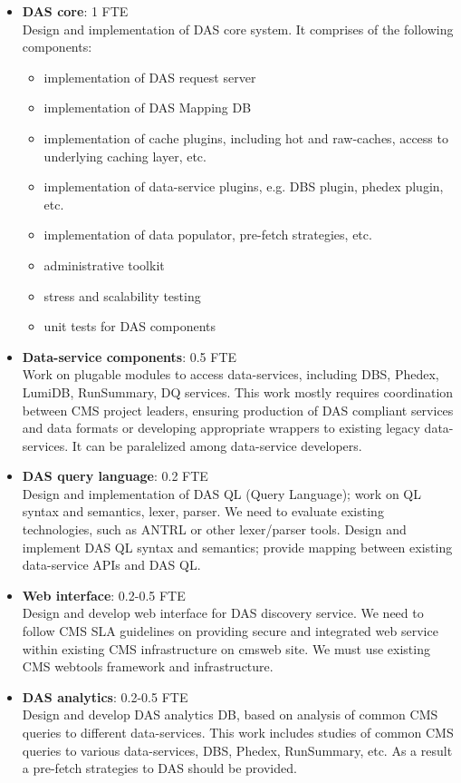 \documentclass[a4paper]{jpconf}
\begin{document}
\begin{itemize}
\item
{\bf DAS core}: 1 FTE\\
Design and implementation of DAS core system. It comprises of the following
components:
\begin{itemize}
\item implementation of DAS request server
\item implementation of DAS Mapping DB
\item implementation of cache plugins, including hot and raw-caches, access
to underlying caching layer, etc.
\item implementation of data-service plugins, e.g. DBS plugin, phedex plugin, etc.
\item implementation of data populator, pre-fetch strategies, etc.
\item administrative toolkit
\item stress and scalability testing
\item unit tests for DAS components
\end{itemize}

\item
{\bf Data-service components}: 0.5 FTE\\
Work on plugable modules to access data-services,
including DBS, Phedex, LumiDB, RunSummary, DQ services.
This work mostly requires coordination between CMS project
leaders, ensuring production of DAS compliant services and data formats or
developing appropriate wrappers to existing legacy data-services. 
It can be paralelized among data-service developers.

\item
{\bf DAS query language}: 0.2 FTE \\
Design and implementation of DAS QL (Query Language);
work on QL syntax and semantics, lexer, parser.
We need to evaluate existing technologies, such as ANTRL or
other lexer/parser tools. Design and implement DAS QL syntax and
semantics; provide mapping between existing data-service APIs and
DAS QL.

\item
{\bf Web interface}: 0.2-0.5 FTE \\
Design and develop web interface for DAS discovery service.
We need to follow CMS SLA guidelines \cite{SLA} on providing secure
and integrated web service within existing CMS infrastructure
on cmsweb site. We must use existing CMS webtools framework
and infrastructure.

\item
{\bf DAS analytics}: 0.2-0.5 FTE \\
Design and develop DAS analytics DB, based on analysis of
common CMS queries to different data-services.
This work includes studies of common CMS queries to
various data-services, DBS, Phedex, RunSummary, etc. As a result
a pre-fetch strategies to DAS should be provided.
\end{itemize}
\end{document}

